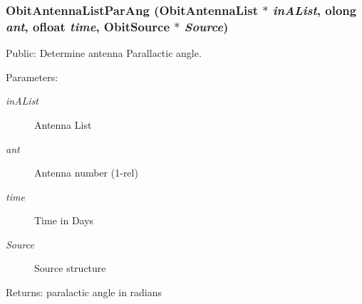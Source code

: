 \subsubsection{ Obit\-Antenna\-List\-Par\-Ang ({\bf Obit\-Antenna\-List} $\ast$ {\em in\-AList}, {\bf olong} {\em ant}, {\bf ofloat} {\em time}, {\bf Obit\-Source} $\ast$ {\em Source})}\label{ObitAntennaList_8c_a13}


Public: Determine antenna Parallactic angle. 

\begin{Desc}
\item[Parameters:]
\begin{description}
\item[{\em in\-AList}]Antenna List \item[{\em ant}]Antenna number (1-rel) \item[{\em time}]Time in Days \item[{\em Source}]Source structure \end{description}
\end{Desc}
\begin{Desc}
\item[Returns:]paralactic angle in radians \end{Desc}
